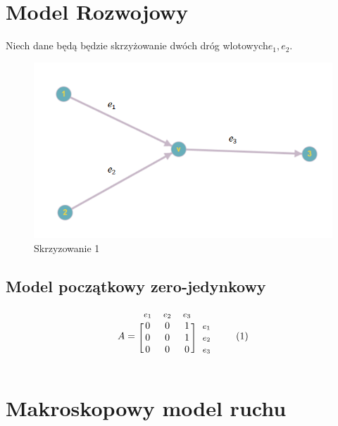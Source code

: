 \documentclass[12pt]{book}
\newcommand\addtag{\refstepcounter{equation}\tag{\theequation}}
\begin{document}
\section{Model Rozwojowy}
Niech dane będą będzie skrzyżowanie dwóch dróg wlotowych$e_1,e_2$. 
\begin{figure}[H]
  \centering
    \includegraphics[width=14cm]{skrz_1}
 \caption{Skrzyzowanie 1}
 \label{fig:skrz_1}
\end{figure}
\subsection{Model początkowy zero-jedynkowy}

\begin{equation*}
  A=
  \begin{blockarray}{*{3}{c} l}
    \begin{block}{*{3}{>{$\footnotesize}c<{$}} l}
      $e_1$ & $e_2$ & $e_3$ \\
    \end{block}
    \begin{block}{[*{3}{c}]>{$\footnotesize}l<{$}}
       0 & 0 & 1 & $e_1$ \\
       0 & 0 & 1 & $e_2$ \\
       0 & 0 & 0 & $e_3$ \\
    \end{block}
  \end{blockarray} \addtag
\end{equation*}






\section{Makroskopowy model ruchu} 
\end{document}
